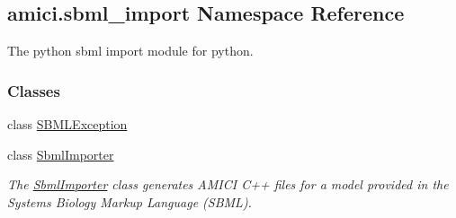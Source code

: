 \hypertarget{namespaceamici_1_1sbml__import}{}\subsection{amici.\+sbml\+\_\+import Namespace Reference}
\label{namespaceamici_1_1sbml__import}


The python sbml import module for python.  


\subsubsection*{Classes}
\begin{DoxyCompactItemize}
\item 
class \mbox{\hyperlink{classamici_1_1sbml__import_1_1_s_b_m_l_exception}{S\+B\+M\+L\+Exception}}
\item 
class \mbox{\hyperlink{classamici_1_1sbml__import_1_1_sbml_importer}{Sbml\+Importer}}
\begin{DoxyCompactList}\small\item\em The \mbox{\hyperlink{classamici_1_1sbml__import_1_1_sbml_importer}{Sbml\+Importer}} class generates A\+M\+I\+CI C++ files for a model provided in the Systems Biology Markup Language (S\+B\+ML). \end{DoxyCompactList}\end{DoxyCompactItemize}
